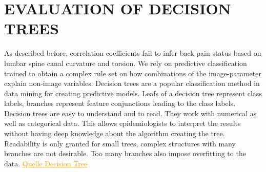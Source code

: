\documentclass[a4paper,twoside]{style/article}
\newcommand{\com}[1]{\textcolor{orange}{\uline{#1}}}
\begin{document}
%


\section{\uppercase{Evaluation of Decision Trees}}
\label{sec:DecisionTrees}
\noindent As described before, correlation coefficients fail to infer back pain status based on lumbar spine canal curvature and torsion.
We rely on predictive classification trained to obtain a complex rule set on how combinations of the image-parameter explain non-image variables.
Decision trees are a popular classification method in data mining for creating predictive models.
Leafs of a decision tree represent class labels, branches represent feature conjunctions leading to the class labels.
Decision trees are easy to understand and to read.
They work with numerical as well as categorical data.
This allows epidemiologists to interpret the results without having deep knowledge about the algorithm creating the tree.
Readability is only granted for small trees, complex structures with many branches are not desirable.
Too many branches also impose overfitting to the data.
\com{Quelle Decision Tree}
\end{document}
